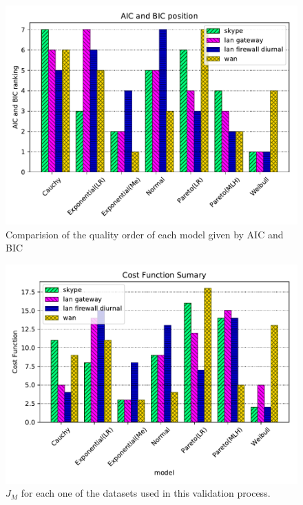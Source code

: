 
\begin{figure}[!ht]
    \centering
    \includegraphics[scale=0.8]{figures/ch4/aic-bic-order}
    \caption{Comparision of the quality order of each model given by AIC and BIC}
    \label{fig:aic-bic-order}
\end{figure}


\begin{figure}[ht!]
\includegraphics[scale=0.8]{figures/ch4/cost-function-summary}
\caption{$J_M$ for each one of the datasets used in this validation process.}
\label{fig:model-order-cost}
\end{figure}

